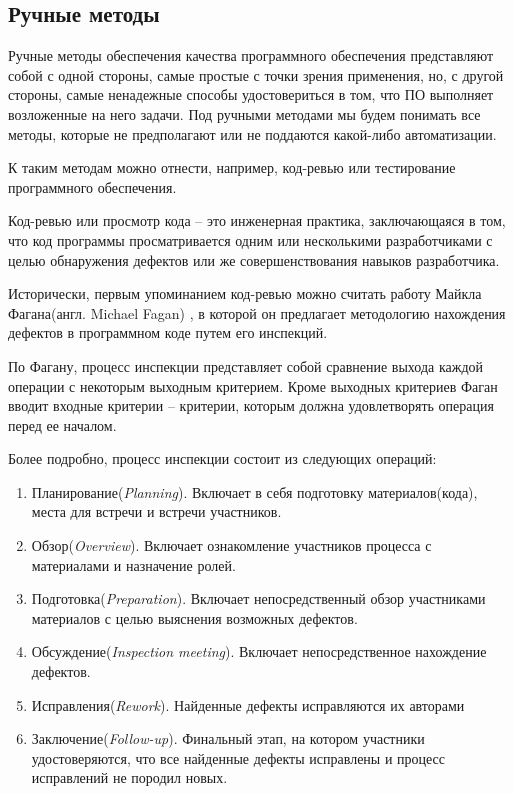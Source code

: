 \subsection{Ручные методы}

Ручные методы обеспечения качества программного обеспечения представляют собой с одной стороны, самые простые с точки зрения применения, но, с другой стороны, самые ненадежные способы удостовериться в том, что ПО выполняет возложенные на него задачи. Под ручными методами мы будем понимать все методы, которые не предполагают или не поддаются какой-либо автоматизации.

К таким методам можно отнести, например, код-ревью или тестирование программного обеспечения.

Код-ревью или просмотр кода -- это инженерная практика, заключающаяся в том, что код программы просматривается одним или несколькими разработчиками с целью обнаружения дефектов или же совершенствования навыков разработчика.

Исторически, первым упоминанием код-ревью можно считать работу Майкла Фагана(англ. Michael Fagan) \cite{fagan1999design}, в которой он предлагает методологию нахождения дефектов в программном коде путем его инспекций.

По Фагану, процесс инспекции представляет собой сравнение выхода каждой операции с некоторым выходным критерием. Кроме выходных критериев Фаган вводит входные критерии -- критерии, которым должна удовлетворять операция перед ее началом.

Более подробно, процесс инспекции состоит из следующих операций:

\begin{enumerate}
  \item Планирование(\textit{Planning}). Включает в себя подготовку материалов(кода), места для встречи и встречи участников.
  \item Обзор(\textit{Overview}). Включает ознакомление участников процесса с материалами и назначение ролей.
  \item Подготовка(\textit{Preparation}). Включает непосредственный обзор участниками материалов с целью выяснения возможных дефектов.
  \item Обсуждение(\textit{Inspection meeting}). Включает непосредственное нахождение дефектов.
  \item Исправления(\textit{Rework}). Найденные дефекты исправляются их авторами
  \item Заключение(\textit{Follow-up}). Финальный этап, на котором участники удостоверяются, что все найденные дефекты исправлены и процесс исправлений не породил новых.
\end{enumerate}

